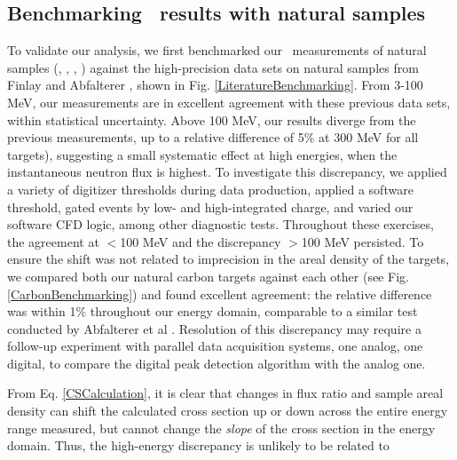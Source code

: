 \subsection{Benchmarking \tot\ results with natural samples}
To validate our analysis, we first benchmarked our \tot\ measurements of natural samples
(\cNat, \niNat, \snNat, \pbNat) against the high-precision data sets on natural samples from Finlay
\cite{Finlay1993} and Abfalterer \cite{Abfalterer2001}, shown in Fig.
\ref{LiteratureBenchmarking}. From 3-100 MeV, our measurements are in excellent agreement with 
these previous data sets, within statistical uncertainty. Above 100 MeV, our results diverge
from the previous measurements, up to a relative difference of 5\% at 300 MeV for all targets), 
suggesting a small 
systematic effect at high energies, when the instantaneous neutron flux is highest. To investigate
this discrepancy, we applied a variety of digitizer thresholds during data production, applied a 
software threshold, gated events by low- and high-integrated charge, and varied our software CFD 
logic, among other diagnostic tests. Throughout these exercises, the agreement at $<$100 MeV and the 
discrepancy $>$100 MeV persisted. To ensure the shift was not related to imprecision in the areal
density of the targets, we compared both our natural carbon targets against each other (see Fig.
\ref{CarbonBenchmarking}) and found excellent agreement: the relative difference
was within 1\% throughout our energy domain, comparable to a similar test conducted by Abfalterer et
al \cite{Abfalterer2001}. Resolution of this discrepancy may require a follow-up experiment with 
parallel data acquisition systems, one analog, one digital, to compare the digital peak detection
algorithm with the analog one.

From Eq. \ref{CSCalculation}, it is clear that changes in flux ratio and sample areal
density can shift the calculated cross section up or down across the entire
energy range measured, but cannot change the \textit{slope} of the cross section
in the energy domain. Thus, the high-energy discrepancy is unlikely to be
related to 

